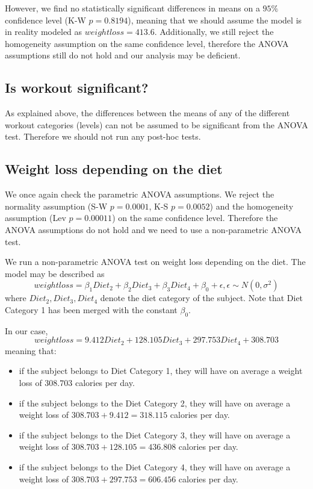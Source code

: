 \documentclass[12pt, a4paper]{article}
\begin{document}
	However, we find no statistically significant differences in means on a $95\%$ confidence level (K-W $p=0.8194$), meaning that we should assume the model is in reality modeled as $weightloss = 413.6$. Additionally, we still reject the  homogeneity assumption on the same confidence level, therefore the ANOVA assumptions still do not hold and our analysis may be deficient.
	
	
	\subsection{Is workout significant?}
	
	As explained above, the differences between the means of any of the different workout categories (levels) can not be assumed to be significant from the ANOVA test. Therefore we should not run any post-hoc tests.
	
	
	\subsection{Weight loss depending on the diet}
	
	We once again check the parametric ANOVA assumptions. We reject the normality assumption (S-W $p=0.0001$, K-S $p=0.0052$) and the homogeneity assumption (Lev $p=0.00011$) on the same confidence level. Therefore the ANOVA assumptions do not hold and we need to use a non-parametric ANOVA test.
	
	We run a non-parametric ANOVA test on weight loss depending on the diet. The model may be described as 
	$$
	weightloss = \beta_1 Diet_2 + \beta_2 Diet_3 + \beta_3 Diet_4 + \beta_0 + \epsilon, \epsilon \sim N(0, \sigma^2)
	$$
	where $Diet_2, Diet_3, Diet_4$ denote the diet category of the subject. Note that Diet Category 1 has been merged with the constant $\beta_0$.
	
	In our case,
	$$
	weightloss = 9.412 Diet_2 + 128.105 Diet_3 + 297.753 Diet_4 + 308.703
	$$
	meaning that:
	
	\begin{itemize}
		\item if the subject belongs to Diet Category 1, they will have on average a weight loss of $308.703$ calories per day.
		
		\item if the subject belongs to the Diet Category 2, they will have on average a weight loss of $308.703 + 9.412 = 318.115$ calories per day.
		
		\item if the subject belongs to the Diet Category 3, they will have on average a weight loss of $308.703 + 128.105 = 436.808$ calories per day.
		
		\item if the subject belongs to the Diet Category 4, they will have on average a weight loss of $308.703 + 297.753 = 606.456$ calories per day.
	\end{itemize}
	
\end{document}
